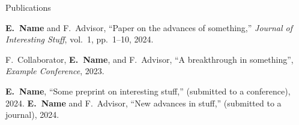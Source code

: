 \prefixmarker{}

\begin{rubric}{Publications}

\entry*[\textsc{[j1]}]
\textbf{E.~Name} and F.~Advisor, ``Paper on the advances of something,'' \emph{Journal of Interesting Stuff}, vol.~1, pp.~1--10, 2024.


\entry*[\textsc{[c1]}]
F.~Collaborator, \textbf{E.~Name}, and F.~Advisor, ``A breakthrough in something'', \emph{Example Conference}, 2023.


\entry*[\textsc{[2]}]
\textbf{E.~Name}, ``Some preprint on interesting stuff,'' (submitted to a conference), 2024.
%
\entry*[\textsc{[1]}]
\textbf{E.~Name} and F.~Advisor, ``New advances in stuff,'' (submitted to a journal), 2024.
\end{rubric}